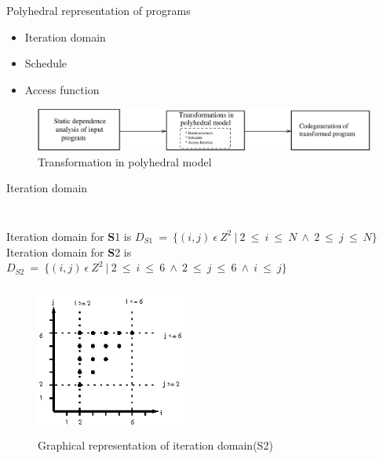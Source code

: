 \documentclass{beamer}
\begin{document}
\begin{frame}{Polyhedral representation of programs}
	\begin{itemize}
	\item Iteration domain
	\item Schedule
	\item Access function
	\end{itemize}
\begin{figure}
\begin{center}
  \includegraphics[width=1\textwidth]{images/poly_steps.eps}
  \caption{Transformation in polyhedral model}
  \label{fig:iter1}
\end{center}  
\end{figure}

\end{frame}

\begin{frame}[shrink]{Iteration domain}
\begin{columns}[t]
	\begin{block}{ }
	{\tiny}
	\end{block}
	
	\begin{block}{ }
	{\tiny}
	\end{block}
	\end{columns}
\pause
Iteration domain for {\textbf S1} is 
$D_{S1}\ =\ \{(i,j)\ \epsilon\ Z^2\ |\ 2\ \leq\ i\ \leq\ N\ \wedge\ 2\ \leq\ j\ \leq\ N\}$
\linebreak\linebreak
Iteration domain for {\textbf S2} is 
$D_{S2}\ =\ \{(i,j)\ \epsilon\ Z^2\ |\ 2\ \leq\ i\ \leq\ 6\ \wedge\ 2\ \leq\ j\ \leq\ 6\ \wedge\ i\ \leq\ j\}$
\pause
\begin{figure}
\begin{center}
  \includegraphics[height=5cm,width=5cm]{images/iter1.eps}
  \caption{Graphical representation of iteration domain(S2)}
  \label{fig:iter1}
\end{center}  
\end{figure}
\end{frame}
\end{document}
